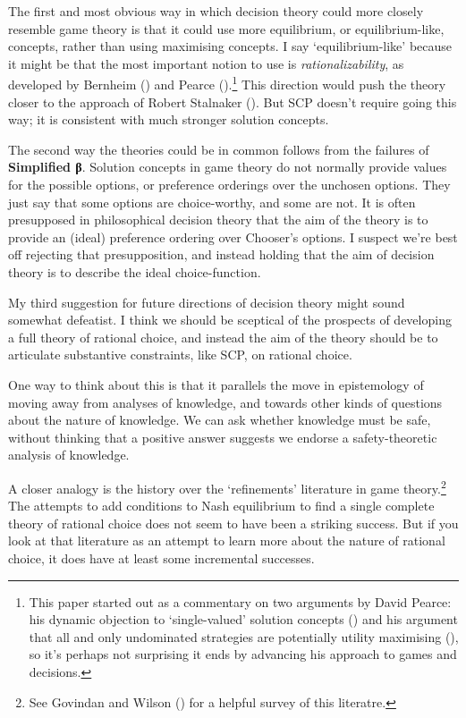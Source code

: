 \documentclass[
  11pt,
  letterpaper,
  DIV=11,
  numbers=noendperiod,
  twoside]{scrartcl}
\begin{document}
The first and most obvious way in which decision theory could more
closely resemble game theory is that it could use more equilibrium, or
equilibrium-like, concepts, rather than using maximising concepts. I say
`equilibrium-like' because it might be that the most important notion to
use is \emph{rationalizability}, as developed by Bernheim
() and Pearce
().\footnote{This paper started out as a
  commentary on two arguments by David Pearce: his dynamic objection to
  `single-valued' solution concepts ()
  and his argument that all and only undominated strategies are
  potentially utility maximising (), so
  it's perhaps not surprising it ends by advancing his approach to games
  and decisions.} This direction would push the theory closer to the
approach of Robert Stalnaker (). But
SCP doesn't require going this way; it is consistent with much stronger
solution concepts.

The second way the theories could be in common follows from the failures
of \textbf{Simplified β}. Solution concepts in game theory do not
normally provide values for the possible options, or preference
orderings over the unchosen options. They just say that some options are
choice-worthy, and some are not. It is often presupposed in
philosophical decision theory that the aim of the theory is to provide
an (ideal) preference ordering over Chooser's options. I suspect we're
best off rejecting that presupposition, and instead holding that the aim
of decision theory is to describe the ideal choice-function.

My third suggestion for future directions of decision theory might sound
somewhat defeatist. I think we should be sceptical of the prospects of
developing a full theory of rational choice, and instead the aim of the
theory should be to articulate substantive constraints, like SCP, on
rational choice.

One way to think about this is that it parallels the move in
epistemology of moving away from analyses of knowledge, and towards
other kinds of questions about the nature of knowledge. We can ask
whether knowledge must be safe, without thinking that a positive answer
suggests we endorse a safety-theoretic analysis of knowledge.

A closer analogy is the history over the `refinements' literature in
game theory.\footnote{See Govindan and Wilson
  () for a helpful survey of this
  literatre.} The attempts to add conditions to Nash equilibrium to find
a single complete theory of rational choice does not seem to have been a
striking success. But if you look at that literature as an attempt to
learn more about the nature of rational choice, it does have at least
some incremental successes.
\end{document}
